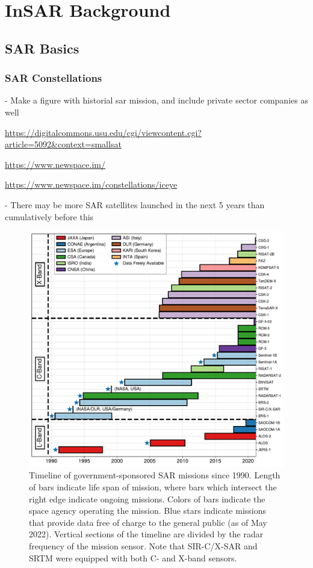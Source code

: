 \documentclass{utexasthesis}
\begin{document}
\chapter{InSAR Background}
\label{chap3}


\section{SAR Basics}
\label{chap3-sar}

\subsection{SAR Constellations}

- Make a figure with historial sar mission, and include private sector companies as well

\url{https://digitalcommons.usu.edu/cgi/viewcontent.cgi?article=5092&context=smallsat}

\url{https://www.newspace.im/ }

\url{https://www.newspace.im/constellations/iceye}


- There may be more SAR satellites launched in the next 5 years than cumulatively before this



\begin{figure}[!htbp]
	\centering
	\includegraphics[width=1.1\textwidth]{figures/chapter3-sar/sar-missions.pdf}
	\caption[Timeline of government SAR missions]{Timeline of government-sponsored SAR missions since 1990. Length of bars indicate life span of mission, where bars which intersect the right edge indicate ongoing missions.
	Colors of bars indicate the space agency operating the mission.
	Blue stars indicate missions that provide data free of charge to the general public (as of May 2022).
	Vertical sections of the timeline are divided by the radar frequency of the mission sensor.
    Note that SIR-C/X-SAR and SRTM were equipped with both C- and X-band sensors.}
	\label{fig:sar-missions}
\end{figure}
\end{document}
